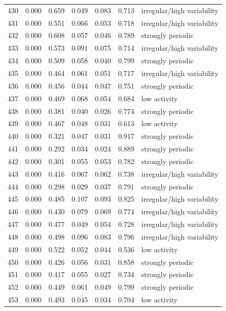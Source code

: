 \begin{longtable}{lrrrrrl}
430 & 0.000 & 0.659 & 0.049 & 0.083 & 0.713 & irregular/high variability \\
431 & 0.000 & 0.551 & 0.066 & 0.053 & 0.718 & irregular/high variability \\
432 & 0.000 & 0.608 & 0.057 & 0.046 & 0.789 & strongly periodic \\
433 & 0.000 & 0.573 & 0.091 & 0.075 & 0.714 & irregular/high variability \\
434 & 0.000 & 0.509 & 0.058 & 0.040 & 0.799 & strongly periodic \\
435 & 0.000 & 0.464 & 0.061 & 0.051 & 0.717 & irregular/high variability \\
436 & 0.000 & 0.456 & 0.044 & 0.047 & 0.751 & strongly periodic \\
437 & 0.000 & 0.469 & 0.068 & 0.054 & 0.684 & low activity \\
438 & 0.000 & 0.381 & 0.040 & 0.026 & 0.774 & strongly periodic \\
439 & 0.000 & 0.467 & 0.048 & 0.031 & 0.613 & low activity \\
440 & 0.000 & 0.321 & 0.047 & 0.031 & 0.917 & strongly periodic \\
441 & 0.000 & 0.292 & 0.034 & 0.024 & 0.889 & strongly periodic \\
442 & 0.000 & 0.301 & 0.055 & 0.053 & 0.782 & strongly periodic \\
443 & 0.000 & 0.416 & 0.067 & 0.062 & 0.738 & irregular/high variability \\
444 & 0.000 & 0.298 & 0.029 & 0.037 & 0.791 & strongly periodic \\
445 & 0.000 & 0.485 & 0.107 & 0.093 & 0.825 & irregular/high variability \\
446 & 0.000 & 0.430 & 0.079 & 0.069 & 0.774 & irregular/high variability \\
447 & 0.000 & 0.477 & 0.049 & 0.054 & 0.728 & irregular/high variability \\
448 & 0.000 & 0.498 & 0.096 & 0.083 & 0.796 & irregular/high variability \\
449 & 0.000 & 0.522 & 0.052 & 0.044 & 0.536 & low activity \\
450 & 0.000 & 0.426 & 0.056 & 0.031 & 0.858 & strongly periodic \\
451 & 0.000 & 0.417 & 0.055 & 0.027 & 0.734 & strongly periodic \\
452 & 0.000 & 0.449 & 0.061 & 0.049 & 0.799 & strongly periodic \\
453 & 0.000 & 0.493 & 0.045 & 0.034 & 0.704 & low activity \\

\end{longtable}
